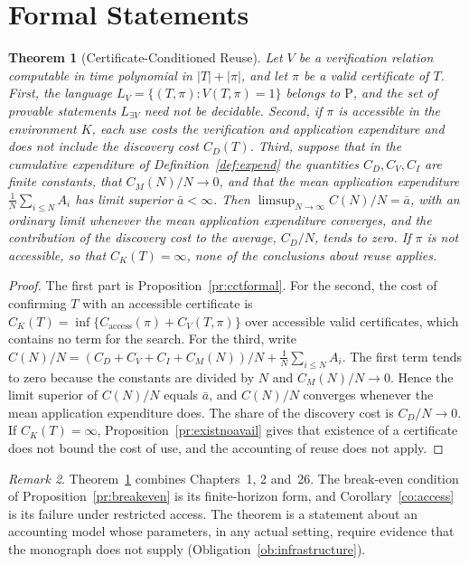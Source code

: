 \documentclass[11pt,letterpaper]{report}
\theoremstyle{plain}
\newtheorem{theorem}{Theorem}[chapter]
\theoremstyle{definition}
\theoremstyle{remark}
\newtheorem{remark}[theorem]{Remark}
\newcommand{\PTIME}{\mathrm{P}}
\begin{document}
\section{Formal Statements}

\begin{theorem}[Certificate-Conditioned Reuse]\label{th:synthreuse}
Let $V$ be a verification relation computable in time polynomial in $|T|+|\pi|$, and let $\pi$ be a valid certificate of $T$.
First, the language $L_V=\{(T,\pi):V(T,\pi)=1\}$ belongs to $\PTIME$, and the set of provable statements $L_{\exists V}$ need not be decidable. Second, if $\pi$ is accessible in the environment $K$, each use costs the verification and application expenditure and does not include the discovery cost $C_D(T)$. Third, suppose that in the cumulative expenditure of Definition~\ref{def:expend} the quantities $C_D,C_V,C_I$ are finite constants, that $C_M(N)/N\to0$, and that the mean application expenditure $\tfrac1N\sum_{i\le N}A_i$ has limit superior $\bar a<\infty$. Then $\limsup_{N\to\infty}C(N)/N=\bar a$, with an ordinary limit whenever the mean application expenditure converges, and the contribution of the discovery cost to the average, $C_D/N$, tends to zero.
If $\pi$ is not accessible, so that $C_K(T)=\infty$, none of the conclusions about reuse applies.
\end{theorem}
\begin{proof}
The first part is Proposition~\ref{pr:cctformal}. For the second, the cost of confirming $T$ with an accessible certificate is $C_K(T)=\inf\{C_{\mathrm{access}}(\pi)+C_V(T,\pi)\}$ over accessible valid certificates, which contains no term for the search. For the third, write $C(N)/N=(C_D+C_V+C_I+C_M(N))/N+\tfrac1N\sum_{i\le N}A_i$. The first term tends to zero because the constants are divided by $N$ and $C_M(N)/N\to0$. Hence the limit superior of $C(N)/N$ equals $\bar a$, and $C(N)/N$ converges whenever the mean application expenditure does. The share of the discovery cost is $C_D/N\to0$. If $C_K(T)=\infty$, Proposition~\ref{pr:existnoavail} gives that existence of a certificate does not bound the cost of use, and the accounting of reuse does not apply.
\end{proof}

\begin{remark}
Theorem~\ref{th:synthreuse} combines Chapters~1, 2 and~26. The break-even condition of Proposition~\ref{pr:breakeven} is its finite-horizon form, and Corollary~\ref{co:access} is its failure under restricted access. The theorem is a statement about an accounting model whose parameters, in any actual setting, require evidence that the monograph does not supply (Obligation~\ref{ob:infrastructure}).
\end{remark}
\end{document}
